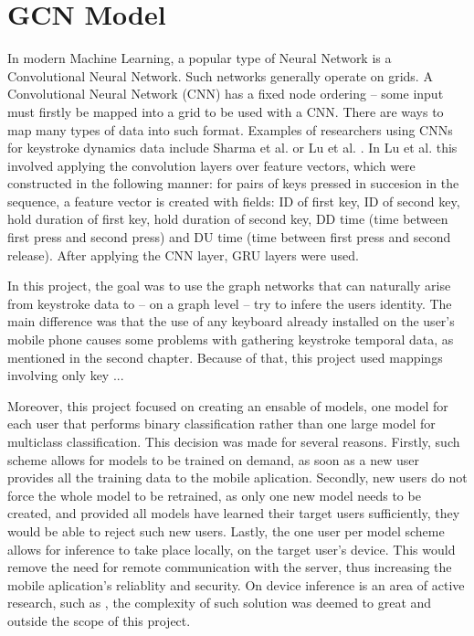 \chapter{GCN Model}

In modern Machine Learning, a popular type of Neural Network is a Convolutional Neural Network. Such networks generally operate on grids. A Convolutional Neural Network (CNN) has a fixed node ordering -- some input must firstly be mapped into a grid to be used with a CNN. There are ways to map many types of data into such format. Examples of researchers using CNNs for keystroke dynamics data include Sharma et al. \cite{Shar2023} or Lu et al. \cite{Lu2020}. In Lu et al. this involved applying the convolution layers over feature vectors, which were constructed in the following manner: for pairs of keys pressed in succesion in the sequence, a feature vector is created with fields: ID of first key, ID of second key, hold duration of first key, hold duration of second key, DD time (time between first press and second press) and DU time (time between first press and second release). After applying the CNN layer, GRU layers were used.

In this project, the goal was to use the graph networks that can naturally arise from keystroke data to -- on a graph level -- try to infere the users identity. The main difference was that the use of any keyboard already installed on the user's mobile phone causes some problems with gathering keystroke temporal data, as mentioned in the second chapter. Because of that, this project used mappings involving only key ...

Moreover, this project focused on creating an ensable of models, one model for each user that performs binary classification rather than one large model for multiclass classification. This decision was made for several reasons. Firstly, such scheme allows for models to be trained on demand, as soon as a new user provides all the training data to the mobile aplication. Secondly, new users do not force the whole model to be retrained, as only one new model needs to be created, and provided all models have learned their target users sufficiently, they would be able to reject such new users. Lastly, the one user per model scheme allows for inference to take place locally, on the target user's device. This would remove the need for remote communication with the server, thus increasing the mobile aplication's reliablity and security. On device inference is an area of active research, such as , the complexity of such solution was deemed to great and outside the scope of this project.